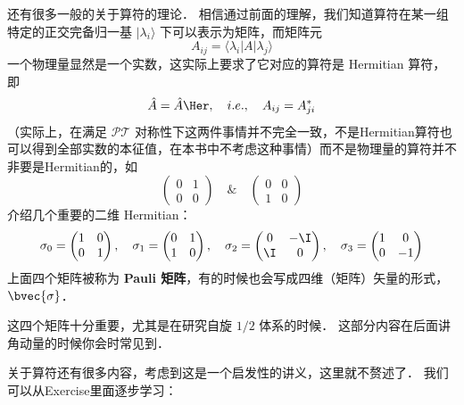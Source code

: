 还有很多一般的关于算符的理论． 相信通过前面的理解，我们知道算符在某一组特定的正交完备归一基 $|\lambda_i\rangle$ 下可以表示为矩阵，而矩阵元
\begin{equation}
A_{ij} = \langle\lambda_i|A|\lambda_j\rangle
\end{equation}
一个物理量显然是一个实数，这实际上要求了它对应的算符是 Hermitian 算符，即
\begin{equation}
\hat{A} = \hat{A}\Her,\quad i.e.,\quad A_{ij} = A_{ji}^*
\end{equation}
（实际上，在满足 $\mathcal{PT}$ 对称性下这两件事情并不完全一致，不是Hermitian算符也可以得到全部实数的本征值，在本书中不考虑这种事情）而不是物理量的算符并不非要是Hermitian的，如
\begin{equation}
\left(\begin{matrix}0 & 1\\0 & 0\end{matrix}\right) \quad \& \quad \left(\begin{matrix}0 & 0\\1 & 0\end{matrix}\right)
\end{equation}
介绍几个重要的二维 Hermitian：
\begin{equation}\label{Basics_eq18}
\sigma_0 = \left(\begin{matrix}1 & 0\\0 & 1\end{matrix}\right),
\quad\sigma_1 = \left(\begin{matrix} 0 & 1\\1 & 0\end{matrix}\right),
\quad\sigma_2 = \left(\begin{matrix} 0 & -\I\\ \I & 0\end{matrix}\right),
\quad\sigma_3 = \left(\begin{matrix} 1 & 0\\0 & -1\end{matrix}\right)  
\end{equation}
上面四个矩阵被称为 \textbf{Pauli 矩阵}，有的时候也会写成四维（矩阵）矢量的形式，$\bvec{\sigma}$．

这四个矩阵十分重要，尤其是在研究自旋 $1/2$ 体系的时候． 这部分内容在后面讲角动量的时候你会时常见到．

关于算符还有很多内容，考虑到这是一个启发性的讲义，这里就不赘述了． 我们可以从Exercise里面逐步学习：

